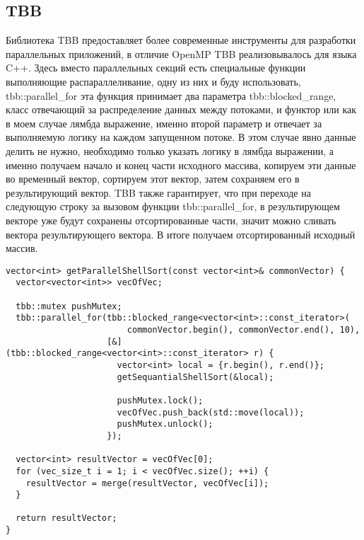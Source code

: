 \documentclass{report}
\begin{document}
\subsection*{TBB}
\par Библиотека TBB предоставляет более современные инструменты для разработки параллельных приложений, в отличие OpenMP TBB реализовывалось для языка C++. Здесь вместо параллельных секций есть специальные функции выполняющие распараллеливание, одну из них и буду использовать, tbb::parallel\_for эта функция принимает два параметра tbb::blocked\_range, класс отвечающий за распределение данных между потоками, и функтор или как в моем случае лямбда выражение, именно второй параметр и отвечает за выполняемую логику на каждом запущенном потоке. В этом случае явно данные делить не нужно, необходимо только указать логику в лямбда выражении, а именно получаем начало и конец части исходного массива, копируем эти данные во временный вектор, сортируем этот вектор, затем сохраняем его в результирующий вектор. TBB также гарантирует, что при переходе на следующую строку за вызовом функции tbb::parallel\_for, в результирующем векторе уже будут сохранены отсортированные части, значит можно сливать вектора результирующего вектора.
В итоге получаем отсортированный исходный массив.

\begin{lstlisting}
vector<int> getParallelShellSort(const vector<int>& commonVector) {
  vector<vector<int>> vecOfVec;

  tbb::mutex pushMutex;
  tbb::parallel_for(tbb::blocked_range<vector<int>::const_iterator>(
                        commonVector.begin(), commonVector.end(), 10),
                    [&](tbb::blocked_range<vector<int>::const_iterator> r) {
                      vector<int> local = {r.begin(), r.end()};
                      getSequantialShellSort(&local);

                      pushMutex.lock();
                      vecOfVec.push_back(std::move(local));
                      pushMutex.unlock();
                    });

  vector<int> resultVector = vecOfVec[0];
  for (vec_size_t i = 1; i < vecOfVec.size(); ++i) {
    resultVector = merge(resultVector, vecOfVec[i]);
  }

  return resultVector;
}
\end{lstlisting}

\newpage
\end{document}
